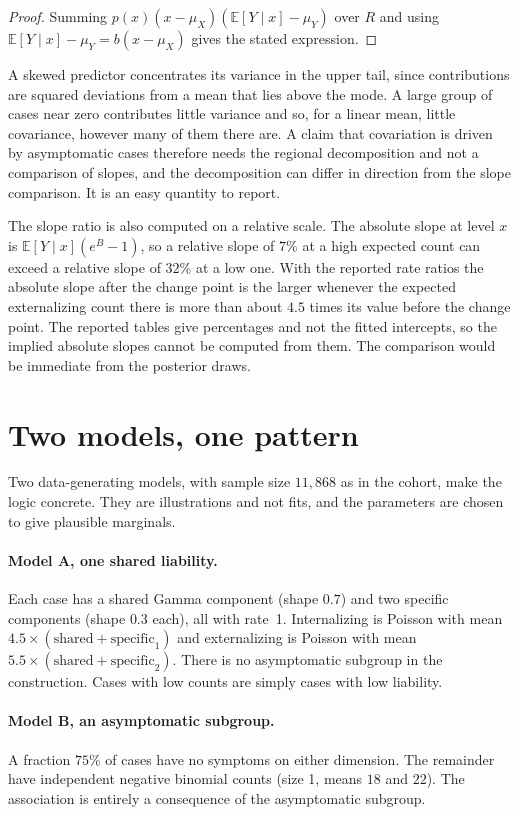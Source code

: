 \documentclass[11pt]{article}
\theoremstyle{definition}
\newcommand{\E}{\mathbb{E}}
\begin{document}
\begin{proof}
Summing $p(x)(x-\mu_X)(\E[Y\mid x]-\mu_Y)$ over $R$ and using $\E[Y\mid x]-\mu_Y=b(x-\mu_X)$ gives the stated expression.
\end{proof}

A skewed predictor concentrates its variance in the upper tail, since contributions are squared deviations from a mean that lies above the mode. A large group of cases near zero contributes little variance and so, for a linear mean, little covariance, however many of them there are. A claim that covariation is driven by asymptomatic cases therefore needs the regional decomposition and not a comparison of slopes, and the decomposition can differ in direction from the slope comparison. It is an easy quantity to report.

The slope ratio is also computed on a relative scale. The absolute slope at level $x$ is $\E[Y\mid x](e^{B}-1)$, so a relative slope of $7\%$ at a high expected count can exceed a relative slope of $32\%$ at a low one. With the reported rate ratios the absolute slope after the change point is the larger whenever the expected externalizing count there is more than about $4.5$ times its value before the change point. The reported tables give percentages and not the fitted intercepts, so the implied absolute slopes cannot be computed from them. The comparison would be immediate from the posterior draws.

\section{Two models, one pattern}

Two data-generating models, with sample size $11{,}868$ as in the cohort, make the logic concrete. They are illustrations and not fits, and the parameters are chosen to give plausible marginals.

\paragraph{Model A, one shared liability.} Each case has a shared Gamma component (shape $0.7$) and two specific components (shape $0.3$ each), all with rate~1. Internalizing is Poisson with mean $4.5\times(\text{shared}+\text{specific}_1)$ and externalizing is Poisson with mean $5.5\times(\text{shared}+\text{specific}_2)$. There is no asymptomatic subgroup in the construction. Cases with low counts are simply cases with low liability.

\paragraph{Model B, an asymptomatic subgroup.} A fraction $75\%$ of cases have no symptoms on either dimension. The remainder have independent negative binomial counts (size 1, means $18$ and $22$). The association is entirely a consequence of the asymptomatic subgroup.
\end{document}
